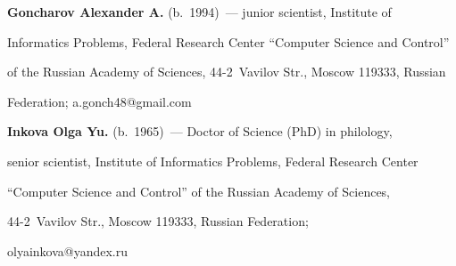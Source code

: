 












  \Contr


  


  \noindent


  \textbf{Goncharov Alexander A.} (b.\ 1994)~--- junior scientist, Institute of 


Informatics Problems, Federal Research Center ``Computer Science and Control'' 


of the Russian Academy of Sciences, 44-2~Vavilov Str., Moscow 119333, Russian 


Federation; \mbox{a.gonch48@gmail.com}


  


  \vspace*{3pt}


  


  \noindent


  \textbf{Inkova Olga Yu.} (b.\ 1965)~--- Doctor of Science (PhD) in philology, 


senior scientist, Institute of Informatics Problems, Federal Research Center 


``Computer Science and Control'' of the Russian Academy of Sciences,  


44-2~Vavilov Str., Moscow 119333, Russian Federation; 


\mbox{olyainkova@yandex.ru}





\label{end\stat}





\renewcommand{\bibname}{\protect\rm Литература}  


